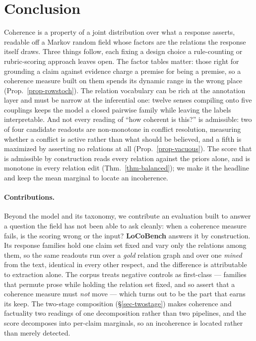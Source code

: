 \section{Conclusion}
\label{sec-conclusion}

Coherence is a property of a joint distribution over what a response asserts, readable off a Markov random field
whose factors are the relations the response itself draws. Three things follow, each fixing a design choice a
rule-counting or rubric-scoring approach leaves open. The factor tables matter: those right for grounding a claim
against evidence charge a premise for being a premise, so a coherence measure built on them spends its dynamic
range in the wrong place (Prop.~\ref{prop-rowstoch}). The relation vocabulary can be rich at the annotation layer
and must be narrow at the inferential one: twelve senses compiling onto five couplings keeps the model a closed
pairwise family while leaving the labels interpretable. And not every reading of ``how coherent is this?'' is
admissible: two of four candidate readouts are non-monotone in conflict resolution, measuring whether a conflict
is active rather than what should be believed, and a fifth is maximized by asserting no relations at all
(Prop.~\ref{prop-vacuous}). The score that is admissible by construction reads every relation against the priors
alone, and is monotone in every relation edit (Thm.~\ref{thm-balanced}); we make it the headline and keep the mean
marginal to locate an incoherence.

\paragraph{Contributions.} Beyond the model and its taxonomy, we contribute an evaluation built to answer a
question the field has not been able to ask cleanly: when a coherence measure fails, is the scoring wrong or the
input? \textbf{LoCoBench} answers it by construction. Its response families hold one claim set fixed and vary
only the relations among them, so the same readouts run over a \emph{gold} relation graph and over one
\emph{mined} from the text, identical in every other respect, and the difference is attributable to extraction
alone. The corpus treats negative controls as first-class --- families that permute prose while holding the
relation set fixed, and so assert that a coherence measure must \emph{not} move --- which turns out to be the
part that earns its keep. The two-stage composition (\S\ref{sec-twostage}) makes coherence and factuality two
readings of one decomposition rather than two pipelines, and the score decomposes into per-claim marginals, so an
incoherence is located rather than merely detected.

